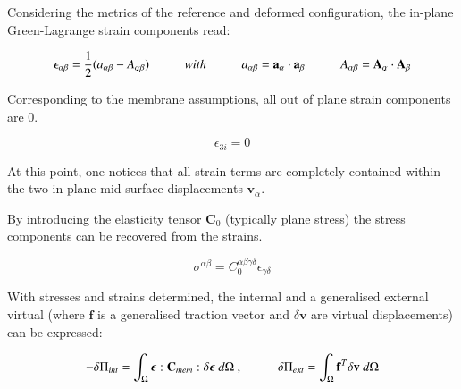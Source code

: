 Considering the metrics of the reference and deformed configuration, the in-plane Green-Lagrange strain components read:

\begin{equation} 
\epsilon_{\alpha\beta} = \frac{1}{2}
(a_{\alpha\beta} - A_{\alpha\beta})
\hspace{10mm}
with
\hspace{10mm}
a_{\alpha\beta} = \mathbf{a}_\alpha \cdot \mathbf{a}_\beta
\hspace{10mm}
A_{\alpha\beta} = \mathbf{A}_\alpha \cdot \mathbf{A}_\beta
\label{eqsmem2}
\end{equation}

Corresponding to the membrane assumptions, all out of plane strain components are 0.

\begin{equation} 
\epsilon_{3i} = 0
\label{eqsmem3}
\end{equation}

At this point, one notices that all strain terms are completely contained within the two in-plane mid-surface displacements $\mathbf{v}_\alpha$.

By introducing the elasticity tensor $\mathbf{C}_0$ (typically plane stress) the stress components can be recovered from the strains.

\begin{equation} 
\sigma^{\alpha\beta} = C_0^{\alpha\beta\gamma\delta} \epsilon_{\gamma\delta}
\label{eqsmem4}
\end{equation}

With stresses and strains determined, the internal and a generalised external virtual (where $\mathbf{f}$ is a generalised traction vector and $\delta \mathbf{v}$ are virtual displacements) can be expressed:

\begin{equation} 
-\delta\Pi_{int} = 
\int_\Omega
\boldsymbol{\epsilon}
:
\mathbf{C}_{mem}
:
\delta \boldsymbol{\epsilon}\ 
d \Omega\ ,
\hspace{10mm}
\delta\Pi_{ext} = \int_\Omega
\mathbf{f}^T
\delta  \mathbf{v}\ 
d \Omega
\label{eqsmem5}
\end{equation}

%

